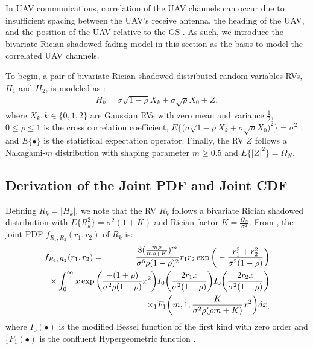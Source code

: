 In UAV communications, correlation of the UAV channels can occur due to insufficient spacing between the UAV's receive antenna, the heading of the UAV, and the position of the UAV relative to the GS \cite{tan2019downlink,jiang2010dynamic,jin2017three,jiang2012optimization}. As such, we introduce the bivariate Rician shadowed fading model in this section as the basis to model the correlated UAV channels.

To begin, a pair of bivariate Rician shadowed distributed random variables RVs, $H_{1}$ and $H_{2}$, is modeled as \cite{lopez2018bivariate}:
\begin{eqnarray} \label{NOMA_bivariate_Rician_Shadowed_rv_bi_rician_shad}
H_k = \sigma\sqrt{1-\rho}X_k + \sigma\sqrt{\rho}X_0 + Z,
\end{eqnarray}
where $X_k, k \in \{0,1,2\}$ are Gaussian RVs with zero mean and variance $\frac{1}{2}$, $0 \leq \rho \leq 1$ is the cross correlation coefficient, $E\big\{ \big(\sigma\sqrt{1-\rho}X_k + \sigma\sqrt{\rho}X_0\big)^2 \big\} = \sigma^2$ \cite{lopez2018bivariate}, and $E\{\bullet\}$ is the statistical expectation operator. Finally, the RV $Z$ follows a Nakagami-$m$ distribution with shaping parameter $m\geq 0.5$ and $E\{|Z|^2\}=\Omega_N$.

\subsection{Derivation of the Joint PDF and Joint CDF}
Defining $R_k = |H_k|$, we note that the RV $R_k$ follows a bivariate Rician shadowed distribution with $E\{R_k^2\}=\sigma^2(1+K)$ and Rician factor $K=\frac{\Omega_N}{\sigma^2}$. From \cite[eq. (4)]{lopez2018bivariate}, the joint PDF $f_{R_1,R_2}(r_1,r_2)$ of $R_k$ is: 
\begin{eqnarray} \label{NOMA_bivariate_Rician_Shadowed_pdf_bi_rician_shad}
 f_{R_1,R_2}(r_1,r_2) & = & \frac{8 (\frac{m \rho}{m \rho + K})^m}{\sigma^6 \rho (1-\rho)^2} r_1 r_2 \exp\bigg(-\frac{r_1^2 + r_2^2}{\sigma^2(1-\rho)}\bigg) \nonumber \\
 & & \hspace{-2.5cm} \times \int_0^\infty x \exp\bigg( \frac{-(1+\rho)}{\sigma^2 \rho(1-\rho)}x^2 \bigg) I_0\bigg( \frac{2r_1x}{\sigma^2(1-\rho)} \bigg) I_0\bigg( \frac{2r_2x}{\sigma^2(1-\rho)} \bigg) \nonumber \\
 & & \hspace{0.8cm} \times {}_1{F_1}\bigg(m,1;\frac{K}{\sigma^2 \rho(\rho m + K)}x^2\bigg) dx_,
\end{eqnarray}
where $I_{0}\left(\bullet\right)$ is the modified Bessel function of the first kind with zero order \cite[eq. (9.6.10)]{abramowitz1964handbook} and ${}_1{F_1}(\bullet)$ is the confluent Hypergeometric function \cite{gradshteyn2014table}.

